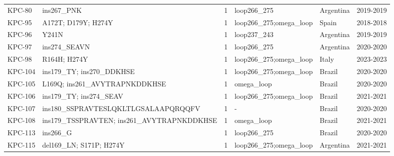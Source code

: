 \begin{longtable}{@{}l p{5.2cm} r p{2.6cm} l l@{}}
KPC-80 & ins267\_PNK & 1 & loop266\_275 & Argentina & 2019-2019 \\
KPC-95 & A172T; D179Y; H274Y & 1 & loop266\_275;omega\_loop & Spain & 2018-2018 \\
KPC-96 & Y241N & 1 & loop237\_243 & Argentina & 2019-2019 \\
KPC-97 & ins274\_SEAVN & 1 & loop266\_275 & Argentina & 2020-2020 \\
KPC-98 & R164H; H274Y & 1 & loop266\_275;omega\_loop & Italy & 2023-2023 \\
KPC-104 & ins179\_TY; ins270\_DDKHSE & 1 & loop266\_275;omega\_loop & Brazil & 2020-2020 \\
KPC-105 & L169Q; ins261\_AVYTRAPNKDDKHSE & 1 & omega\_loop & Brazil & 2020-2020 \\
KPC-106 & ins179\_TY; ins274\_SEAV & 1 & loop266\_275;omega\_loop & Brazil & 2021-2021 \\
KPC-107 & ins180\_SSPRAVTESLQKLTLGSALAAPQRQQFV & 1 & - & Brazil & 2020-2020 \\
KPC-108 & ins179\_TSSPRAVTEN; ins261\_AVYTRAPNKDDKHSE & 1 & omega\_loop & Brazil & 2021-2021 \\
KPC-113 & ins266\_G & 1 & loop266\_275 & Brazil & 2020-2020 \\
KPC-115 & del169\_LN; S171P; H274Y & 1 & loop266\_275;omega\_loop & Argentina & 2021-2021 \\
\end{longtable}
